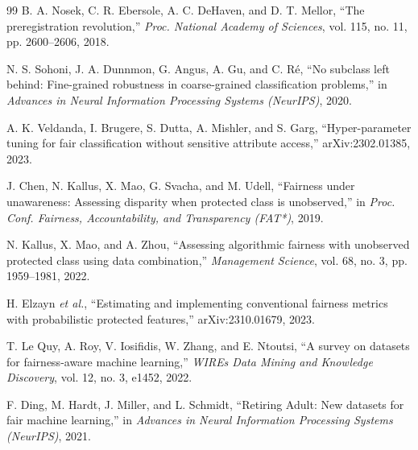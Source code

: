 \documentclass[conference]{IEEEtran}
\begin{document}
\begin{thebibliography}{99}
B. A. Nosek, C. R. Ebersole, A. C. DeHaven, and D. T. Mellor, ``The preregistration revolution,'' \emph{Proc. National Academy of Sciences}, vol. 115, no. 11, pp. 2600--2606, 2018.

N. S. Sohoni, J. A. Dunnmon, G. Angus, A. Gu, and C. R\'{e}, ``No subclass left behind: Fine-grained robustness in coarse-grained classification problems,'' in \emph{Advances in Neural Information Processing Systems (NeurIPS)}, 2020.

A. K. Veldanda, I. Brugere, S. Dutta, A. Mishler, and S. Garg, ``Hyper-parameter tuning for fair classification without sensitive attribute access,'' arXiv:2302.01385, 2023.

J. Chen, N. Kallus, X. Mao, G. Svacha, and M. Udell, ``Fairness under unawareness: Assessing disparity when protected class is unobserved,'' in \emph{Proc. Conf. Fairness, Accountability, and Transparency (FAT*)}, 2019.

N. Kallus, X. Mao, and A. Zhou, ``Assessing algorithmic fairness with unobserved protected class using data combination,'' \emph{Management Science}, vol. 68, no. 3, pp. 1959--1981, 2022.

H. Elzayn \emph{et al.}, ``Estimating and implementing conventional fairness metrics with probabilistic protected features,'' arXiv:2310.01679, 2023.

T. Le Quy, A. Roy, V. Iosifidis, W. Zhang, and E. Ntoutsi, ``A survey on datasets for fairness-aware machine learning,'' \emph{WIREs Data Mining and Knowledge Discovery}, vol. 12, no. 3, e1452, 2022.

F. Ding, M. Hardt, J. Miller, and L. Schmidt, ``Retiring Adult: New datasets for fair machine learning,'' in \emph{Advances in Neural Information Processing Systems (NeurIPS)}, 2021.


\end{thebibliography}
\end{document}
